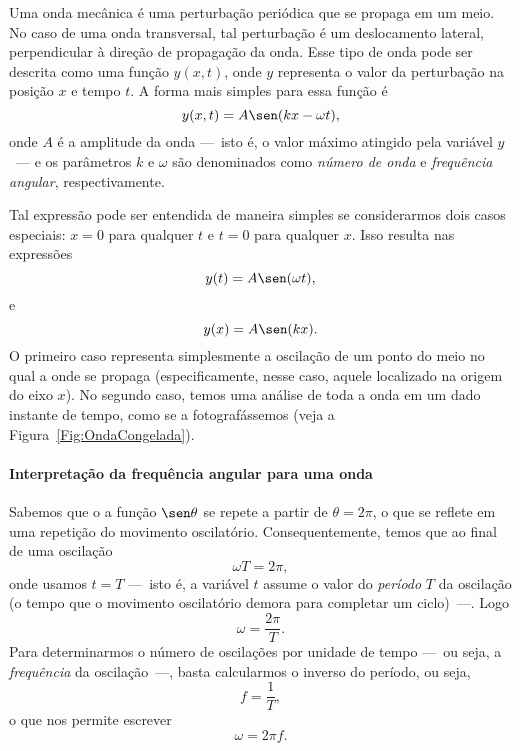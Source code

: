 Uma onda mecânica é uma perturbação periódica que se propaga em um meio. No caso de uma onda transversal, tal perturbação é um deslocamento lateral, perpendicular à direção de propagação da onda. Esse tipo de onda pode ser descrita como uma função $y(x,t)$, onde $y$ representa o valor da perturbação na posição $x$ e tempo $t$. A forma mais simples para essa função é
\begin{equation}\label{Eq:OndaUnidimensional}
	y(x,t) = A \sen(kx - \omega t),
\end{equation}
%
onde $A$ é a amplitude da onda ---~isto é, o valor máximo atingido pela variável $y$~--- e os parâmetros $k$ e $\omega$ são denominados como \emph{número de onda} e \emph{frequência angular}, respectivamente.

Tal expressão pode ser entendida de maneira simples se considerarmos dois casos especiais: $x = 0$ para qualquer $t$ e $t = 0$ para qualquer $x$. Isso resulta nas expressões
\begin{equation}
	y(t) = A \sen (\omega t),
\end{equation}
%
e
\begin{equation}
	y(x) = A \sen(kx).
\end{equation}
%
O primeiro caso representa simplesmente a oscilação de um ponto do meio no qual a onde se propaga (especificamente, nesse caso, aquele localizado na origem do eixo $x$). No segundo caso, temos uma análise de toda a onda em um dado instante de tempo, como se a fotografássemos (veja a Figura~\ref{Fig:OndaCongelada}).

\paragraph{Interpretação da frequência angular para uma onda}

Sabemos que o a função $\sen \theta$ se repete a partir de $\theta = 2\pi$, o que se reflete em uma repetição do movimento oscilatório. Consequentemente, temos que ao final de uma oscilação
\begin{equation}
	\omega T = 2 \pi,
\end{equation}
%
onde usamos $t = T$ ---~isto é, a variável $t$ assume o valor do \emph{período} $T$ da oscilação (o tempo que o movimento oscilatório demora para completar um ciclo)~---. Logo
\begin{equation}
	\omega = \frac{2 \pi}{T}.
\end{equation}
%
Para determinarmos o número de oscilações por unidade de tempo ---~ou seja, a \emph{frequência} da oscilação~---, basta calcularmos o inverso do período, ou seja,
\begin{equation}
	f = \frac{1}{T},
\end{equation}
%
o que nos permite escrever
\begin{equation}
	\omega = 2 \pi f.
\end{equation}

